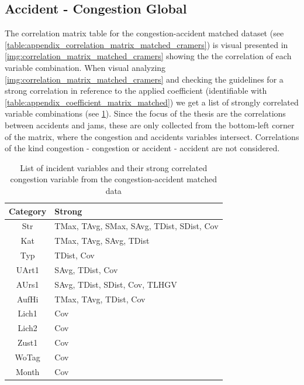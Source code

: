 \subsection{Accident - Congestion Global}
\label{analysis_processing_correlation_baysis_matched}
The correlation matrix table for the congestion-accident matched dataset (see \cref{table:appendix_correlation_matrix_matched_cramers}) is visual presented in \cref{img:correlation_matrix_matched_cramers} showing the the correlation of each variable combination. When visual analyzing \cref{img:correlation_matrix_matched_cramers} and checking the guidelines for a strong correlation in reference to the applied coefficient (identifiable with \cref{table:appendix_coefficient_matrix_matched}) we get a list of strongly correlated variable combinations (see \cref{tbl:correlation_list_baysis_matched}). Since the focus of the thesis are the correlations between accidents and jams, these are only collected from the bottom-left corner of the matrix, where the congestion and accidents variables intersect. Correlations of the kind congestion - congestion or accident - accident are not considered.
\begin{table}[ht]
	\centering
	\begin{tabular}{c|l}  
		\toprule
		Category & Strong \\
		\midrule
		Str & TMax, TAvg, SMax, SAvg, TDist, SDist, Cov \\ 
 		Kat & TMax, TAvg, SAvg, TDist \\
 		Typ & TDist, Cov \\
 		UArt1 & SAvg, TDist, Cov \\ %
 		AUrs1 & SAvg, TDist, SDist, Cov, TLHGV \\ %
 		AufHi & TMax, TAvg, TDist, Cov \\
 		Lich1 & Cov \\
 		Lich2 & Cov \\ %
 		Zust1 & Cov \\ %
 		WoTag & Cov \\
		Month & Cov \\ %
		\bottomrule
	\end{tabular}
	\caption{List of incident variables and their strong correlated congestion variable from the congestion-accident matched data}
	\label{tbl:correlation_list_baysis_matched}
\end{table}
